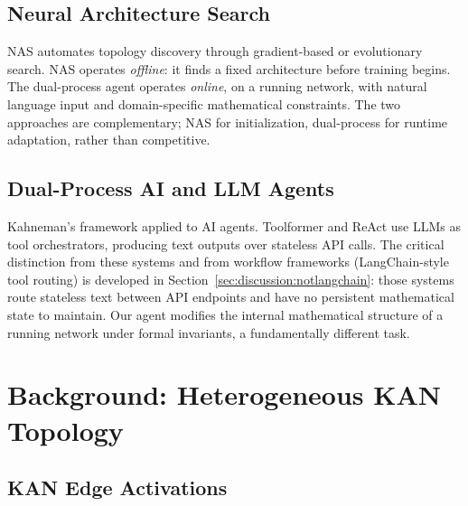 \documentclass[11pt,a4paper]{article}
\begin{document}
\subsection{Neural Architecture Search}

NAS \citep{elsken2019neural} automates topology discovery through gradient-based
\citep{liu2019darts} or evolutionary search. NAS operates \emph{offline}: it finds
a fixed architecture before training begins. The dual-process agent operates
\emph{online}, on a running network, with natural language input and domain-specific
mathematical constraints. The two approaches are complementary; NAS for
initialization, dual-process for runtime adaptation, rather than competitive.

\subsection{Dual-Process AI and LLM Agents}

Kahneman's framework \citep{kahneman2011thinking} applied to AI agents. Toolformer
\citep{schick_etal_2023_toolformer} and ReAct \citep{yao_etal_2023_react} use LLMs
as tool orchestrators, producing text outputs over stateless API calls. The critical
distinction from these systems and from workflow frameworks (LangChain-style tool
routing) is developed in Section~\ref{sec:discussion:notlangchain}: those systems
route stateless text between API endpoints and have no persistent mathematical state
to maintain. Our agent modifies the internal mathematical structure of a running
network under formal invariants, a fundamentally different task.

\section{Background: Heterogeneous KAN Topology}
\label{sec:background}

\subsection{KAN Edge Activations}
\label{sec:background:edges}
\end{document}
